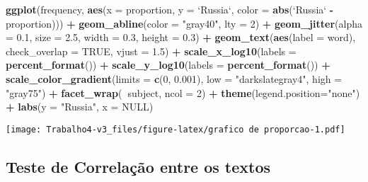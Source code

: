 \documentclass[]{article}
\newenvironment{Shaded}{\begin{snugshade}}{\end{snugshade}}
\newcommand{\DataTypeTok}[1]{\textcolor[rgb]{0.13,0.29,0.53}{#1}}
\newcommand{\DecValTok}[1]{\textcolor[rgb]{0.00,0.00,0.81}{#1}}
\newcommand{\FloatTok}[1]{\textcolor[rgb]{0.00,0.00,0.81}{#1}}
\newcommand{\KeywordTok}[1]{\textcolor[rgb]{0.13,0.29,0.53}{\textbf{#1}}}
\newcommand{\NormalTok}[1]{#1}
\newcommand{\OperatorTok}[1]{\textcolor[rgb]{0.81,0.36,0.00}{\textbf{#1}}}
\newcommand{\OtherTok}[1]{\textcolor[rgb]{0.56,0.35,0.01}{#1}}
\newcommand{\StringTok}[1]{\textcolor[rgb]{0.31,0.60,0.02}{#1}}
\begin{document}
\begin{Shaded}
\begin{Highlighting}[]
\KeywordTok{ggplot}\NormalTok{(frequency, }\KeywordTok{aes}\NormalTok{(}\DataTypeTok{x =}\NormalTok{ proportion, }\DataTypeTok{y =} \StringTok{`}\DataTypeTok{Russia}\StringTok{`}\NormalTok{, }\DataTypeTok{color =} \KeywordTok{abs}\NormalTok{(}\StringTok{`}\DataTypeTok{Russia}\StringTok{`} \OperatorTok{-}\StringTok{ }\NormalTok{proportion))) }\OperatorTok{+}
\StringTok{  }\KeywordTok{geom_abline}\NormalTok{(}\DataTypeTok{color =} \StringTok{"gray40"}\NormalTok{, }\DataTypeTok{lty =} \DecValTok{2}\NormalTok{) }\OperatorTok{+}
\StringTok{  }\KeywordTok{geom_jitter}\NormalTok{(}\DataTypeTok{alpha =} \FloatTok{0.1}\NormalTok{, }\DataTypeTok{size =} \FloatTok{2.5}\NormalTok{, }\DataTypeTok{width =} \FloatTok{0.3}\NormalTok{, }\DataTypeTok{height =} \FloatTok{0.3}\NormalTok{) }\OperatorTok{+}
\StringTok{  }\KeywordTok{geom_text}\NormalTok{(}\KeywordTok{aes}\NormalTok{(}\DataTypeTok{label =}\NormalTok{ word), }\DataTypeTok{check_overlap =} \OtherTok{TRUE}\NormalTok{, }\DataTypeTok{vjust =} \FloatTok{1.5}\NormalTok{) }\OperatorTok{+}
\StringTok{  }\KeywordTok{scale_x_log10}\NormalTok{(}\DataTypeTok{labels =} \KeywordTok{percent_format}\NormalTok{()) }\OperatorTok{+}
\StringTok{  }\KeywordTok{scale_y_log10}\NormalTok{(}\DataTypeTok{labels =} \KeywordTok{percent_format}\NormalTok{()) }\OperatorTok{+}
\StringTok{  }\KeywordTok{scale_color_gradient}\NormalTok{(}\DataTypeTok{limits =} \KeywordTok{c}\NormalTok{(}\DecValTok{0}\NormalTok{, }\FloatTok{0.001}\NormalTok{), }\DataTypeTok{low =} \StringTok{"darkslategray4"}\NormalTok{, }\DataTypeTok{high =} \StringTok{"gray75"}\NormalTok{) }\OperatorTok{+}
\StringTok{  }\KeywordTok{facet_wrap}\NormalTok{(}\OperatorTok{~}\NormalTok{subject, }\DataTypeTok{ncol =} \DecValTok{2}\NormalTok{) }\OperatorTok{+}
\StringTok{  }\KeywordTok{theme}\NormalTok{(}\DataTypeTok{legend.position=}\StringTok{"none"}\NormalTok{) }\OperatorTok{+}
\StringTok{  }\KeywordTok{labs}\NormalTok{(}\DataTypeTok{y =} \StringTok{"Russia"}\NormalTok{, }\DataTypeTok{x =} \OtherTok{NULL}\NormalTok{)}
\end{Highlighting}
\end{Shaded}

\texttt{[image: Trabalho4-v3\_files/figure-latex/grafico de proporcao-1.pdf]}

\hypertarget{teste-de-correlacao-entre-os-textos}{%
\subsection{Teste de Correlação entre os
textos}\label{teste-de-correlacao-entre-os-textos}}
\end{document}
